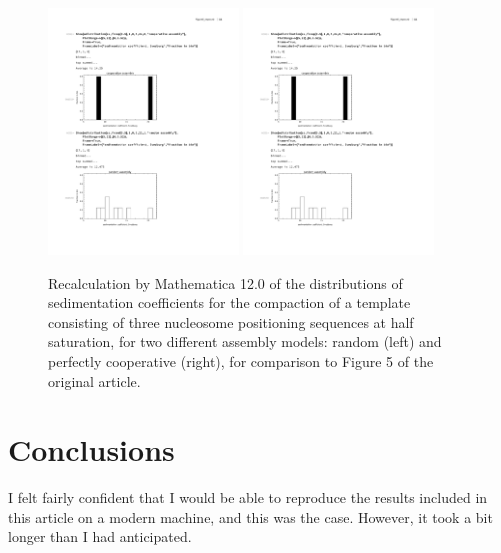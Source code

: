 \begin{figure}[H]
\centering
\includegraphics[width=0.45\textwidth]{figs/figure5aM12.pdf}
\includegraphics[width=0.45\textwidth]{figs/figure5bM12.pdf}
\caption{Recalculation by Mathematica 12.0 of the distributions of sedimentation coefficients for the compaction of a template consisting of three nucleosome positioning sequences at half saturation, for two different assembly models: random (left) and perfectly cooperative (right), for comparison to Figure 5 of the original article.}
\label{figure5}
\end{figure}


\section{Conclusions}

I felt fairly confident that I would be able to reproduce the results included in this article on a modern machine, and this was the case. However, it took a bit longer than I had anticipated.

